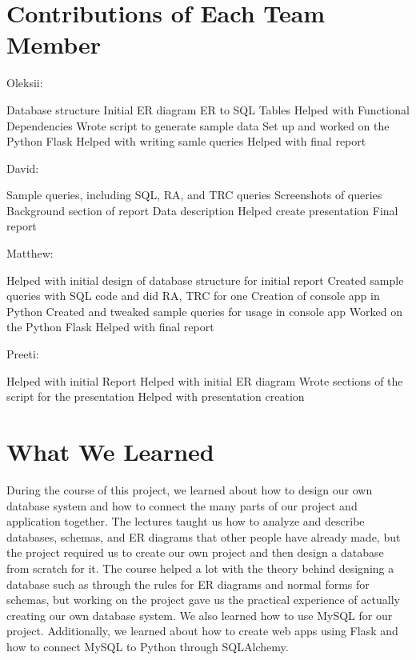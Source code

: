 \documentclass[12pt, oneside]{article}
\begin{document}
    \section{Contributions of Each Team Member}
    Oleksii:
    \begin{outline}
        \1 Database structure
        \1 Initial ER diagram
        \1 ER to SQL Tables
        \1 Helped with Functional Dependencies
        \1 Wrote script to generate sample data
        \1 Set up and worked on the Python Flask
        \1 Helped with writing samle queries
        \1 Helped with final report
    \end{outline}
    David:
    \begin{outline}
        \1 Sample queries, including SQL, RA, and TRC queries
        \1 Screenshots of queries
        \1 Background section of report
        \1 Data description
        \1 Helped create presentation
        \1 Final report
    \end{outline}
    Matthew:
    \begin{outline}
        \1 Helped with initial design of database structure for initial report
        \1 Created sample queries with SQL code and did RA, TRC for one
        \1 Creation of console app in Python
        \1 Created and tweaked sample queries for usage in console app
        \1 Worked on the Python Flask
        \1 Helped with final report
    \end{outline}
    Preeti:
    \begin{outline}
        \1 Helped with initial Report
        \1 Helped with initial ER diagram
        \1 Wrote sections of the script for the presentation
        \1 Helped with presentation creation
    \end{outline}
    \section{What We Learned}
    During the course of this project, we learned about how to design our own database system and how to connect the many parts of our project and application together. The lectures taught us how to analyze and describe databases, schemas, and ER diagrams that other people have already made, but the project required us to create our own project and then design a database from scratch for it. The course helped a lot with the theory behind designing a database such as through the rules for ER diagrams and normal forms for schemas, but working on the project gave us the practical experience of actually creating our own database system. We also learned how to use MySQL for our project. Additionally, we learned about how to create web apps using Flask and how to connect MySQL to Python through SQLAlchemy.
\end{document}
